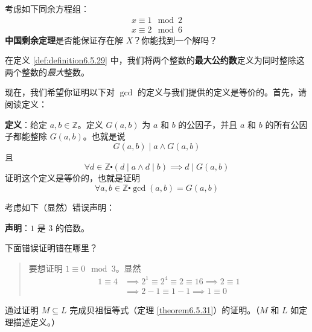 \begin{exercise}
    考虑如下同余方程组：
    \begin{align*}
        x \equiv 1 \mod 2\\
        x \equiv 2 \mod 6
    \end{align*}
    \textbf{中国剩余定理}是否能保证存在解 $X$？你能找到一个解吗？
\end{exercise}

\begin{exercise}
    在定义 \ref{def:definition6.5.29} 中，我们将两个整数的\textbf{最大公约数}定义为同时整除这两个整数的\emph{最大}整数。

    现在，我们希望你证明以下对 $\gcd$ 的定义与我们提供的定义是等价的。首先，请阅读定义：

    \textbf{定义}：给定 $a, b \in \mathbb{Z}$。定义 $G(a,b)$ 为 $a$ 和 $b$ 的公因子，并且 $a$ 和 $b$ 的所有公因子都能整除 $G(a, b)$。也就是说
    \[G(a, b) \mid a \land G(a, b)\]
    且
    \[\forall d \in \mathbb{Z} \centerdot (d \mid a \land d \mid b) \implies d \mid G(a,b)\]
    证明这个定义是等价的，也就是证明
    \[\forall a, b \in \mathbb{Z} \centerdot \gcd(a, b) = G(a, b)\]
\end{exercise}

\begin{exercise}
    考虑如下（显然）错误声明：

    \textbf{声明}：$1$ 是 $3$ 的倍数。

    下面错误证明错在哪里？

    \begin{quote}
        要想证明 $1 \equiv 0 \mod 3$。显然
        \begin{align*}
            1 \equiv 4 &\implies 2^1 \equiv 2^4 \equiv 2 \equiv 16 \implies 2 \equiv 1 \\
            &\implies 2 - 1 \equiv 1 - 1 \implies 1 ≡ 0
        \end{align*}
    \end{quote}
\end{exercise}

\begin{exercise}\label{exc:exercises6.7.12}
    通过证明 $M \subseteq L$ 完成贝祖恒等式（定理 \ref{theorem6.5.31}）的证明。（$M$ 和 $L$ 如定理描述定义。）
\end{exercise}

